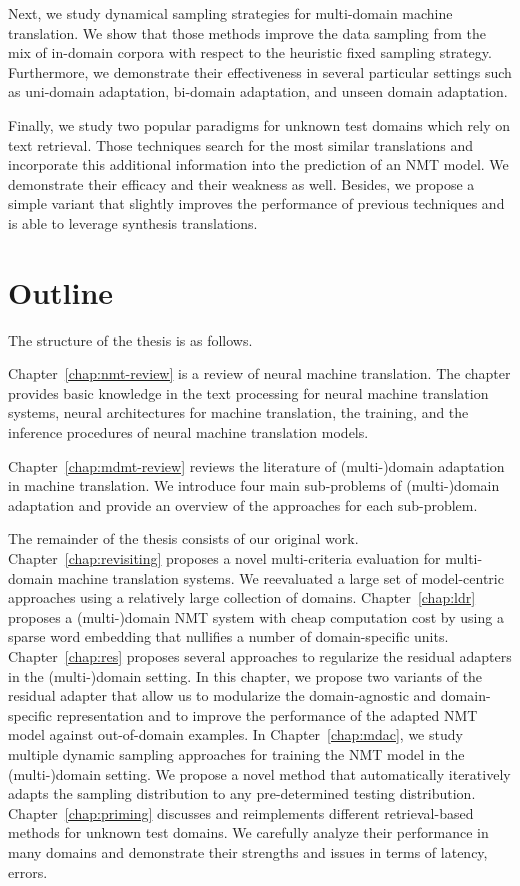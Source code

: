 Next, we study dynamical sampling strategies for multi-domain machine translation. We show that those methods improve the data sampling from the mix of in-domain corpora with respect to the heuristic fixed sampling strategy. Furthermore, we demonstrate their effectiveness in several particular settings such as uni-domain adaptation, bi-domain adaptation, and unseen domain adaptation.

Finally, we study two popular paradigms for unknown test domains which rely on text retrieval. Those techniques search for the most similar translations and incorporate this additional information into the prediction of an NMT model. We demonstrate their efficacy and their weakness as well. Besides, we propose a simple variant that slightly improves the performance of previous techniques and is able to leverage synthesis translations.

\section{Outline}
The structure of the thesis is as follows.

Chapter~\ref{chap:nmt-review} is a review of neural machine translation. The chapter provides basic knowledge in the text processing for neural machine translation systems, neural architectures for machine translation, the training, and the inference procedures of neural machine translation models.

Chapter~\ref{chap:mdmt-review} reviews the literature of (multi-)domain adaptation in machine translation. We introduce four main sub-problems of (multi-)domain adaptation and provide an overview of the approaches for each sub-problem.

The remainder of the thesis consists of our original work. Chapter~\ref{chap:revisiting} proposes a novel multi-criteria evaluation for multi-domain machine translation systems. We reevaluated a large set of model-centric approaches using a relatively large collection of domains. Chapter~\ref{chap:ldr} proposes a (multi-)domain NMT system with cheap computation cost by using a sparse word embedding that nullifies a number of domain-specific units. Chapter~\ref{chap:res} proposes several approaches to regularize the residual adapters \citep{Bapna19simple} in the (multi-)domain setting. In this chapter, we propose two variants of the residual adapter that allow us to modularize the domain-agnostic and domain-specific representation and to improve the performance of the adapted NMT model against out-of-domain examples. In Chapter~\ref{chap:mdac}, we study multiple dynamic sampling approaches for training the NMT model in the (multi-)domain setting. We propose a novel method that automatically iteratively adapts the sampling distribution to any pre-determined testing distribution. Chapter~\ref{chap:priming} discusses and reimplements different retrieval-based methods for unknown test domains. We carefully analyze their performance in many domains and demonstrate their strengths and issues in terms of latency, errors. 

